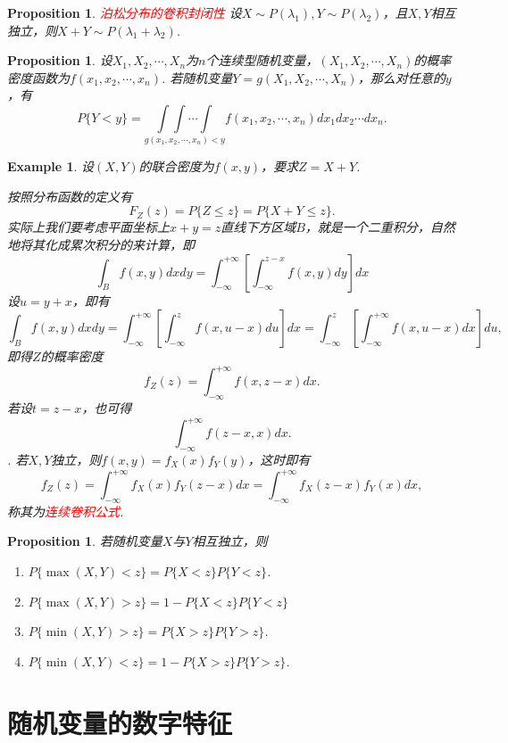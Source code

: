 \documentclass{article}
\newtheorem{proposition}[theorem]{Proposition}
\newtheorem{example}[theorem]{Example}
\newcommand{\redt}[1]{\textcolor{red}{#1}}
\begin{document}
\begin{proposition}
\rm \redt{泊松分布的卷积封闭性} 设$X \sim P(\lambda_1),Y \sim P(\lambda_2)$，且$X,Y$相互独立，则$X+Y \sim P(\lambda_1 + \lambda_2)$. 
\end{proposition}

\begin{proposition}
\rm 设$X_1,X_2,\cdots,X_n$为$n$个连续型随机变量，$(X_1,X_2,\cdots,X_n)$的概率密度函数为$f(x_1,x_2,\cdots,x_n)$. 若随机变量$Y=g(X_1,X_2,\cdots,X_n)$，那么对任意的$y$，有
$$
P\{Y < y\} = \underset{g(x_1,x_2,\cdots,x_n) < y}{\int\int\cdots\int}f(x_1,x_2,\cdots,x_n)dx_1dx_2\cdots dx_n.
$$
\end{proposition}

\begin{example}
\rm 设$(X,Y)$的联合密度为$f(x,y)$，要求$Z=X+Y$.

按照分布函数的定义有
$$
F_Z(z)=P\{Z \leq z\} = P\{X+Y \leq z\}.
$$
实际上我们要考虑平面坐标上$x+y=z$直线下方区域$B$，就是一个二重积分，自然地将其化成累次积分的来计算，即
$$
\int_{B} f(x,y)dxdy = \int_{-\infty}^{+\infty}\left[ \int_{-\infty}^{z-x} f(x,y)dy \right] dx
$$
设$u = y+x$，即有
$$
\int_{B} f(x,y)dxdy = \int_{-\infty}^{+\infty}\left[ \int_{-\infty}^{z} f(x,u-x)du \right] dx = \int_{-\infty}^{z} \left[ \int_{-\infty}^{+\infty} f(x,u-x)dx \right] du, 
$$
即得$Z$的概率密度
$$
f_Z(z) = \int_{-\infty}^{+\infty} f(x,z-x)dx.
$$
若设$t=z-x$，也可得
$$
\int_{-\infty}^{+\infty} f(z-x,x)dx.
$$.
若$X,Y$独立，则$f(x,y)=f_X(x)f_Y(y)$，这时即有
$$
f_Z(z) = \int_{-\infty}^{+\infty} f_X(x)f_Y(z-x)dx = \int_{-\infty}^{+\infty} f_X(z-x)f_Y(x)dx,
$$
称其为\redt{连续卷积公式}. 
\end{example}

\begin{proposition}
\rm 若随机变量$X$与$Y$相互独立，则
\begin{enumerate}
	\item $P\{\max(X,Y) < z\} = P\{X < z\}P\{Y < z\}$.
	\item $P\{\max(X,Y) > z\} = 1-  P\{X < z\}P\{Y < z\}$
	\item $P\{\min(X,Y) > z\} = P\{X>z\}P\{Y>z\}$.  
	\item $P\{\min(X,Y) < z\} = 1-P\{X>z\}P\{Y>z\}$.
\end{enumerate}
\end{proposition}

\newpage
\section{随机变量的数字特征}
\end{document}
